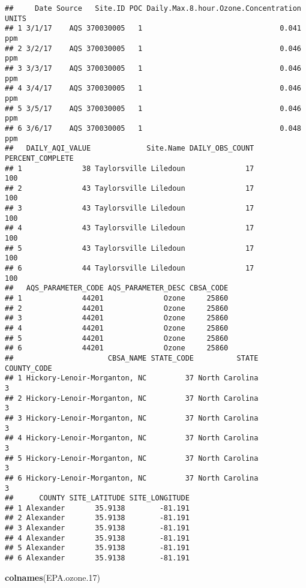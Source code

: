 \documentclass[]{article}
\newenvironment{Shaded}{\begin{snugshade}}{\end{snugshade}}
\newcommand{\KeywordTok}[1]{\textcolor[rgb]{0.13,0.29,0.53}{\textbf{#1}}}
\newcommand{\DecValTok}[1]{\textcolor[rgb]{0.00,0.00,0.81}{#1}}
\newcommand{\NormalTok}[1]{#1}
\begin{document}
\begin{verbatim}
##     Date Source   Site.ID POC Daily.Max.8.hour.Ozone.Concentration UNITS
## 1 3/1/17    AQS 370030005   1                                0.041   ppm
## 2 3/2/17    AQS 370030005   1                                0.046   ppm
## 3 3/3/17    AQS 370030005   1                                0.046   ppm
## 4 3/4/17    AQS 370030005   1                                0.046   ppm
## 5 3/5/17    AQS 370030005   1                                0.046   ppm
## 6 3/6/17    AQS 370030005   1                                0.048   ppm
##   DAILY_AQI_VALUE             Site.Name DAILY_OBS_COUNT PERCENT_COMPLETE
## 1              38 Taylorsville Liledoun              17              100
## 2              43 Taylorsville Liledoun              17              100
## 3              43 Taylorsville Liledoun              17              100
## 4              43 Taylorsville Liledoun              17              100
## 5              43 Taylorsville Liledoun              17              100
## 6              44 Taylorsville Liledoun              17              100
##   AQS_PARAMETER_CODE AQS_PARAMETER_DESC CBSA_CODE
## 1              44201              Ozone     25860
## 2              44201              Ozone     25860
## 3              44201              Ozone     25860
## 4              44201              Ozone     25860
## 5              44201              Ozone     25860
## 6              44201              Ozone     25860
##                      CBSA_NAME STATE_CODE          STATE COUNTY_CODE
## 1 Hickory-Lenoir-Morganton, NC         37 North Carolina           3
## 2 Hickory-Lenoir-Morganton, NC         37 North Carolina           3
## 3 Hickory-Lenoir-Morganton, NC         37 North Carolina           3
## 4 Hickory-Lenoir-Morganton, NC         37 North Carolina           3
## 5 Hickory-Lenoir-Morganton, NC         37 North Carolina           3
## 6 Hickory-Lenoir-Morganton, NC         37 North Carolina           3
##      COUNTY SITE_LATITUDE SITE_LONGITUDE
## 1 Alexander       35.9138        -81.191
## 2 Alexander       35.9138        -81.191
## 3 Alexander       35.9138        -81.191
## 4 Alexander       35.9138        -81.191
## 5 Alexander       35.9138        -81.191
## 6 Alexander       35.9138        -81.191
\end{verbatim}

\begin{Shaded}
\begin{Highlighting}[]
\KeywordTok{colnames}\NormalTok{(EPA.ozone.}\DecValTok{17}\NormalTok{)}
\end{Highlighting}
\end{Shaded}
\end{document}
